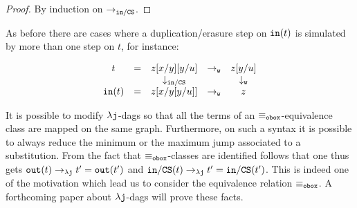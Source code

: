 \documentclass{LMCS}
\renewcommand{\>}{\rightarrow}
\def\lam{\lambda}
\newcommand{\Rew}[1]{\rightarrow_{#1}}
\newcommand{\dis}{{\tt j}}
\newcommand{\ldis}{\lam{\dis}}
\newcommand{\lj}{\lam{\dis}}
\newcommand{\out}{{\tt out}}
\newcommand{\Gc}{{\tt w}}
\newcommand{\CS}{{\tt CS}}
\newcommand{\modulo}[2]{#1/#2}
\newcommand{\eqw}[1]{\equiv_{#1}}
\newcommand{\fsymb}{\osymb\boite}
\newcommand{\osymb}{{\tt o}}
\newcommand{\eqf}{\eqw{\fsymb}}
\newcommand{\inn}{\modulo{{\tt in}}{\CS}}
\newcommand{\innn}{{\tt in}}
\newcommand{\boite}{{\tt box}}
\begin{document}
{\begin{proof}
By induction on $\Rew{\inn}$.
\end{proof}

As before there are cases where a duplication/erasure step on $\innn(t)$ is simulated by more than one step on $t$, for instance:

\[ \begin{array}{cccccccccc}
t&=&z[x/y][y/u]& \Rew{\Gc}&z[y/u]\\
&&\downarrow_{\inn}&&\downarrow_{\Gc}\\
\innn(t)&=&z[x/y[y/u]]&\Rew{\Gc}& z
   \end{array} \]

It is possible to modify $\lj$-dags so that all the terms of an
$\eqf$-equivalence class are mapped on the same graph. Furthermore, on
such a syntax it is possible to always reduce the minimum or the maximum
jump associated to a substitution. From the fact that $\eqf$-classes
are identified follows that one thus gets $\out(t)\Rew{\ldis}
t'=\out(t')$ and $\inn(t)\Rew{\ldis} t'=\inn(t')$. This is indeed one
of the motivation which lead us to consider the equivalence relation $\eqf$. A
forthcoming paper about $\lj$-dags will prove these facts. }
\end{document}
